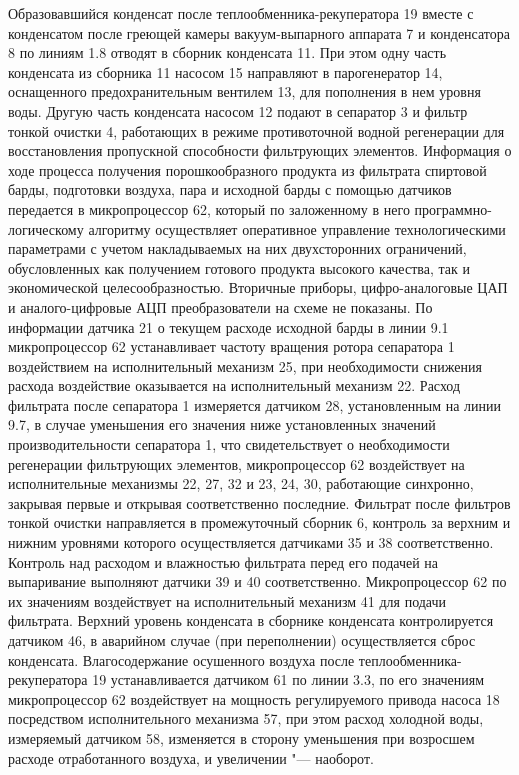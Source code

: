 Образовавшийся конденсат после теплообменника-рекуператора 19 вместе с конденсатом после греющей камеры вакуум-выпарного аппарата 7 и конденсатора 8 по линиям 1.8 отводят в сборник конденсата 11. 
При этом одну часть конденсата из сборника 11 насосом 15 направляют в парогенератор 14, оснащенного предохранительным вентилем 13, для пополнения в нем уровня воды. 
Другую часть конденсата насосом 12 подают в сепаратор 3 и фильтр тонкой очистки 4, работающих в режиме противоточной водной регенерации для восстановления пропускной способности фильтрующих элементов.
Информация о ходе процесса получения порошкообразного продукта из фильтрата спиртовой барды, подготовки воздуха, пара и исходной барды с помощью датчиков передается в микропроцессор 62, который по заложенному в него программно-логическому алгоритму осуществляет оперативное управление технологическими параметрами с учетом накладываемых на них двухсторонних ограничений, обусловленных как получением готового продукта высокого качества, так и экономической целесообразностью. 
Вторичные приборы, цифро-аналоговые ЦАП и аналого-цифровые АЦП преобразователи на схеме не показаны.
По информации датчика 21 о текущем расходе исходной барды в линии 9.1 микропроцессор 62 устанавливает частоту вращения ротора сепаратора 1 воздействием на исполнительный механизм 25, при необходимости снижения расхода воздействие оказывается на исполнительный механизм 22.
Расход фильтрата после сепаратора 1 измеряется датчиком 28, установленным на линии 9.7, в случае уменьшения его значения ниже установленных значений производительности сепаратора 1, что свидетельствует о необходимости регенерации фильтрующих элементов, микропроцессор 62 воздействует на исполнительные механизмы 22, 27, 32 и 23, 24, 30, работающие синхронно, закрывая первые и открывая соответственно последние.
Фильтрат после фильтров тонкой очистки направляется в промежуточный сборник 6, контроль за верхним и нижним уровнями которого осуществляется датчиками 35 и 38 соответственно. 
Контроль над расходом и влажностью фильтрата перед его подачей на выпаривание выполняют датчики 39 и 40 соответственно. 
Микропроцессор 62 по их значениям воздействует на исполнительный механизм 41 для подачи фильтрата.
Верхний уровень конденсата в сборнике конденсата контролируется датчиком 46, в аварийном случае (при переполнении) осуществляется сброс конденсата.
Влагосодержание осушенного воздуха после теплообменника-рекуператора 19 устанавливается датчиком 61 по линии 3.3, по его значениям микропроцессор 62 воздействует на мощность регулируемого привода насоса 18 посредством исполнительного механизма 57, при этом расход холодной воды, измеряемый датчиком 58, изменяется в сторону уменьшения при возросшем расходе отработанного воздуха, и увеличении  "---  наоборот.
